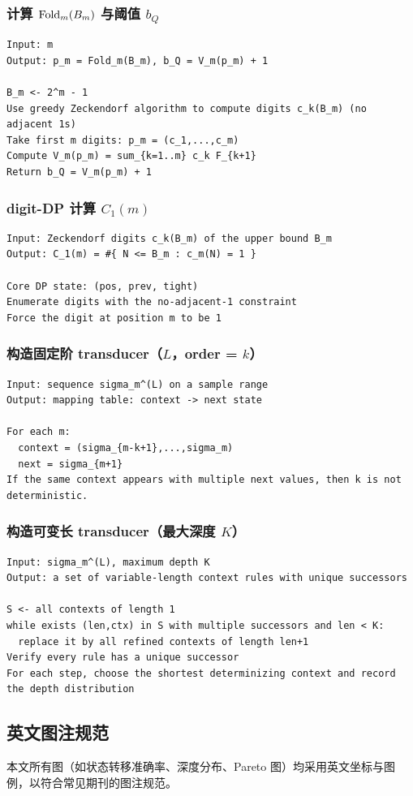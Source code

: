 \subsubsection{计算 \texorpdfstring{$\mathrm{Fold}_m(B_m)$}{Fold\_m(B\_m)} 与阈值 \texorpdfstring{$b_Q$}{b\_Q}}

\begin{Verbatim}
Input: m
Output: p_m = Fold_m(B_m), b_Q = V_m(p_m) + 1

B_m <- 2^m - 1
Use greedy Zeckendorf algorithm to compute digits c_k(B_m) (no adjacent 1s)
Take first m digits: p_m = (c_1,...,c_m)
Compute V_m(p_m) = sum_{k=1..m} c_k F_{k+1}
Return b_Q = V_m(p_m) + 1
\end{Verbatim}

\subsubsection{digit-DP 计算 \texorpdfstring{$C_1(m)$}{C\_1(m)}}

\begin{Verbatim}
Input: Zeckendorf digits c_k(B_m) of the upper bound B_m
Output: C_1(m) = #{ N <= B_m : c_m(N) = 1 }

Core DP state: (pos, prev, tight)
Enumerate digits with the no-adjacent-1 constraint
Force the digit at position m to be 1
\end{Verbatim}

\subsubsection{构造固定阶 transducer（\texorpdfstring{$L$}{L}，order = \texorpdfstring{$k$}{k}）}

\begin{Verbatim}
Input: sequence sigma_m^(L) on a sample range
Output: mapping table: context -> next state

For each m:
  context = (sigma_{m-k+1},...,sigma_m)
  next = sigma_{m+1}
If the same context appears with multiple next values, then k is not deterministic.
\end{Verbatim}

\subsubsection{构造可变长 transducer（最大深度 \texorpdfstring{$K$}{K}）}

\begin{Verbatim}
Input: sigma_m^(L), maximum depth K
Output: a set of variable-length context rules with unique successors

S <- all contexts of length 1
while exists (len,ctx) in S with multiple successors and len < K:
  replace it by all refined contexts of length len+1
Verify every rule has a unique successor
For each step, choose the shortest determinizing context and record the depth distribution
\end{Verbatim}

\subsection{英文图注规范}

本文所有图（如状态转移准确率、深度分布、Pareto 图）均采用英文坐标与图例，以符合常见期刊的图注规范。

